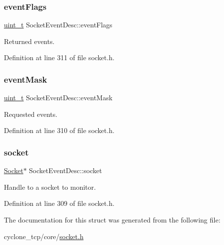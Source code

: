 \subsubsection{\texorpdfstring{event\+Flags}{eventFlags}}
{\footnotesize\ttfamily \hyperlink{compiler__port_8h_a12a1e9b3ce141648783a82445d02b58d}{uint\+\_\+t} Socket\+Event\+Desc\+::event\+Flags}



Returned events. 



Definition at line 311 of file socket.\+h.

\mbox{\label{structSocketEventDesc_ac979f02c9bb6b9517ed9c2d1b17e6201}} 
\subsubsection{\texorpdfstring{event\+Mask}{eventMask}}
{\footnotesize\ttfamily \hyperlink{compiler__port_8h_a12a1e9b3ce141648783a82445d02b58d}{uint\+\_\+t} Socket\+Event\+Desc\+::event\+Mask}



Requested events. 



Definition at line 310 of file socket.\+h.

\mbox{\label{structSocketEventDesc_a31fbff5c4d515c81ff43934e8aeba08c}} 
\subsubsection{\texorpdfstring{socket}{socket}}
{\footnotesize\ttfamily \hyperlink{socket_8h_aa85acfb0fa336ef495e6ba87fb88fc48}{Socket}$\ast$ Socket\+Event\+Desc\+::socket}



Handle to a socket to monitor. 



Definition at line 309 of file socket.\+h.



The documentation for this struct was generated from the following file\+:\begin{DoxyCompactItemize}
\item 
cyclone\+\_\+tcp/core/\hyperlink{socket_8h}{socket.\+h}\end{DoxyCompactItemize}
